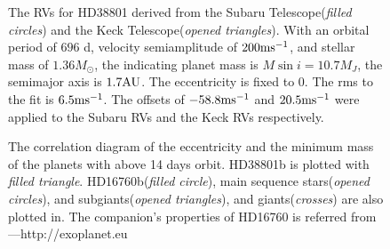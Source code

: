 \documentclass[manuscript]{aastex}
\begin{document}
\clearpage
\begin{figure}
\caption{The RVs for HD38801 derived from the Subaru Telescope({\it filled circles}) and the Keck Telescope({\it opened triangles}). With an orbital period of $696$ d, velocity semiamplitude of $200 {\rm ms}^{-1}$, and stellar mass of $1.36M_{\odot}$, the indicating planet mass is $M\sin i=10.7M_J$, the semimajor axis is $1.7 {\rm AU}$.
The eccentricity is fixed to 0.
The rms to the fit is $6.5{\rm ms^{-1}}$. The offsets of $-58.8{\rm ms}^{-1}$ and $20.5{\rm ms}^{-1}$ were applied to the Subaru RVs and the Keck RVs respectively.\label{fig_fit}}
\end{figure}

\clearpage
\begin{figure}
\caption{The correlation diagram of the eccentricity and the minimum mass of the planets with above 14 days orbit.
HD38801b is plotted with {\it filled triangle}.
HD16760b({\it filled circle}), main sequence stars({\it opened circles}), and subgiants({\it opened triangles}), and giants({\it crosses}) are also plotted in.
The companion's properties of HD16760 is referred from \cite{2009ApJ...703..671S}
---http://exoplanet.eu \label{fig_m_e}}
\end{figure}
\end{document}

